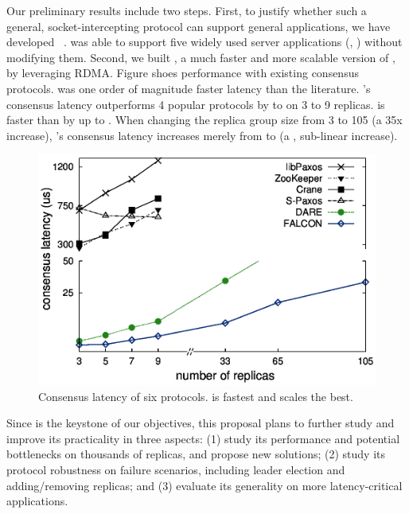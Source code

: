  Our preliminary results include two steps. First, 
to justify whether such a general, socket-intercepting protocol can support 
general applications, we have developed \crane~\cite{crane:sosp15}. \crane was 
able to support five widely used server applications (\eg, \mysql) without 
modifying them. Second, we built \falcon, a much faster and more scalable 
version of \crane, by leveraging RDMA. Figure shoes \falcon performance with 
existing consensus protocols. \falcon was one order of magnitude faster latency 
than the literature. \falcon's consensus latency outperforms 4 popular \paxos 
protocols by \comptradlow to \comptradhigh on 3 to 9 replicas. \falcon is 
faster than \dare by up to \fasterDARE. When changing the replica group size 
from 3 to 105 (a 35x increase), \falcon's consensus latency increases merely 
from \xxxlatencythree \us to \xxxlatencyonezerofive \us (a \xxxscalability, 
sub-linear increase).

\begin{figure}[!htb]
\centering
\includegraphics[width=0.34\textheight]{figures/traditional_paxos_latency.ps}
        \vspace{-.2in}
        \caption{Consensus latency of six \paxos protocols. \falcon is fastest 
and scales the best.}
        \label{fig:scalability}
\end{figure}

 Since \falcon is the keystone of our objectives, this 
proposal plans to further study and improve its practicality in three aspects: 
(1) study its performance and potential bottlenecks on thousands of replicas, 
and propose new solutions; (2) study its protocol robustness on failure 
scenarios, including leader election and adding/removing replicas; and (3) 
evaluate its generality on more latency-critical applications. 

